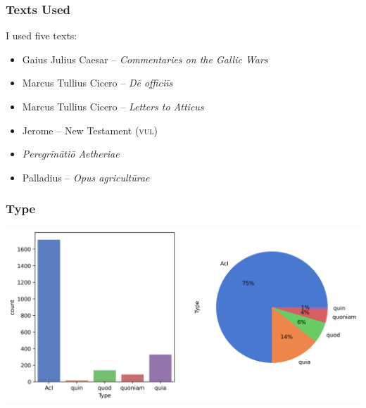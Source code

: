 \documentclass{beamer}
\begin{document}
\begin{frame}
\frametitle{Texts Used}
I used five texts:
\begin{itemize}
    \item Gaius Julius Caesar -- \textit{Commentaries on the Gallic Wars}
    \item Marcus Tullius Cicero -- \textit{Dē officiīs}
    \item Marcus Tullius Cicero -- \textit{Letters to Atticus}
    \item Jerome -- New Testament (\textsc{vul})
    \item \textit{Peregrīnātiō Aetheriae}
    \item Palladius -- \textit{Opus agricultūrae}
\end{itemize}

\end{frame}

\begin{frame}
\frametitle{Type}
\begin{center}
    \includegraphics[width=\textwidth,height=\textheight,keepaspectratio]{graphs/type.png}
\end{center}
\end{frame}
\end{document}
